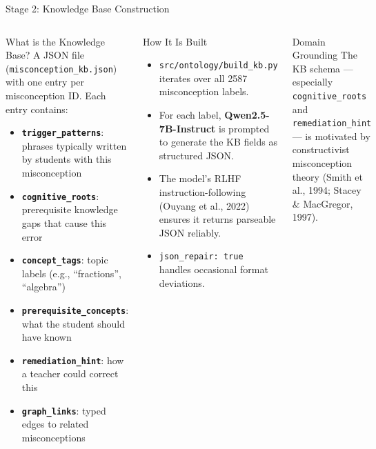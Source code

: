 ﻿\documentclass[aspectratio=169,10pt]{beamer}
\begin{document}
\begin{frame}{Stage 2: Knowledge Base Construction}
\begin{columns}[T]
\begin{block}{What is the Knowledge Base?}
A JSON file (\texttt{misconception\_kb.json}) with one entry per misconception ID. Each entry contains:
\begin{itemize}
  \item \textbf{\texttt{trigger\_patterns}}: phrases typically written by students with this misconception
  \item \textbf{\texttt{cognitive\_roots}}: prerequisite knowledge gaps that cause this error
  \item \textbf{\texttt{concept\_tags}}: topic labels (e.g., ``fractions'', ``algebra'')
  \item \textbf{\texttt{prerequisite\_concepts}}: what the student should have known
  \item \textbf{\texttt{remediation\_hint}}: how a teacher could correct this
  \item \textbf{\texttt{graph\_links}}: typed edges to related misconceptions
\end{itemize}
\end{block}
\begin{block}{How It Is Built}
\begin{itemize}
  \item \texttt{src/ontology/build\_kb.py} iterates over all 2587 misconception labels.
  \item For each label, \textbf{Qwen2.5-7B-Instruct} is prompted to generate the KB fields as structured JSON.
  \item The model's RLHF instruction-following (Ouyang et al., 2022) ensures it returns parseable JSON reliably.
  \item \texttt{json\_repair: true} handles occasional format deviations.
\end{itemize}
\end{block}
\vspace{8pt}
\begin{block}{Domain Grounding}
The KB schema --- especially \texttt{cognitive\_roots} and \texttt{remediation\_hint} --- is motivated by constructivist misconception theory (Smith et al., 1994; Stacey \& MacGregor, 1997).
\end{block}
\end{columns}
\end{frame}
\end{document}
